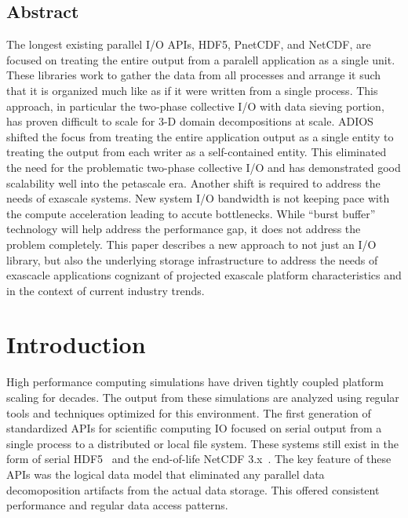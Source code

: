 \documentclass[letterpaper,twocolumn,10pt]{article}
\begin{document}
\thispagestyle{empty}


\subsection*{Abstract}
The longest existing parallel I/O APIs, HDF5, PnetCDF, and NetCDF, are focused
on treating the entire output from a paralell application as a single unit.
These libraries work to gather the data from all processes and arrange it such
that it is organized much like as if it were written from a single process.
This approach, in particular the two-phase collective I/O with data sieving
portion, has proven difficult to scale for 3-D domain decompositions at scale.
ADIOS shifted the focus from treating the entire application output as a single
entity to treating the output from each writer as a self-contained entity. This
eliminated the need for the problematic two-phase collective I/O and has
demonstrated good scalability well into the petascale era. Another shift is
required to address the needs of exascale systems. New system I/O bandwidth is
not keeping pace with the compute acceleration leading to accute bottlenecks.
While ``burst buffer'' technology will help address the performance gap, it
does not address the problem completely. This paper describes a new approach
to not just an I/O library, but also the underlying storage infrastructure to
address the needs of exascacle applications cognizant of projected exascale
platform characteristics and in the context of current industry trends.

\section{Introduction}

High performance computing simulations have driven tightly coupled platform
scaling for decades. The output from these simulations are analyzed using
regular tools and techniques optimized for this environment.  The first
generation of standardized APIs for scientific computing IO focused on serial
output from a single process to a distributed or local file system.  These
systems still exist in the form of serial
HDF5~\cite{chilan:2006:hdf5-performance} and the end-of-life NetCDF
3.x~\cite{netcdf3}. The key feature of these APIs was the logical data model
that eliminated any parallel data decomoposition artifacts from the actual data
storage. This offered consistent performance and regular data access patterns.
\end{document}
